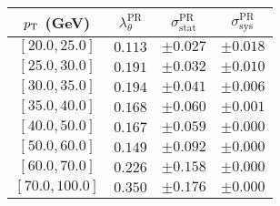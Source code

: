 \begin{tabular}{c||c||c|c}
$p_\text{T}$ (GeV) & $\lambda_\theta^{\text{PR}}$ & $\sigma_{\text{stat}}^{\text{PR}}$ & $\sigma_{\text{sys}}^{\text{PR}}$  \\
\hline
$[20.0, 25.0]$& $0.113$ & $\pm0.027$ & $\pm0.018$\\
$[25.0, 30.0]$& $0.191$ & $\pm0.032$ & $\pm0.010$\\
$[30.0, 35.0]$& $0.194$ & $\pm0.041$ & $\pm0.006$\\
$[35.0, 40.0]$& $0.168$ & $\pm0.060$ & $\pm0.001$\\
$[40.0, 50.0]$& $0.167$ & $\pm0.059$ & $\pm0.000$\\
$[50.0, 60.0]$& $0.149$ & $\pm0.092$ & $\pm0.000$\\
$[60.0, 70.0]$& $0.226$ & $\pm0.158$ & $\pm0.000$\\
$[70.0, 100.0]$& $0.350$ & $\pm0.176$ & $\pm0.000$\\
\end{tabular}
